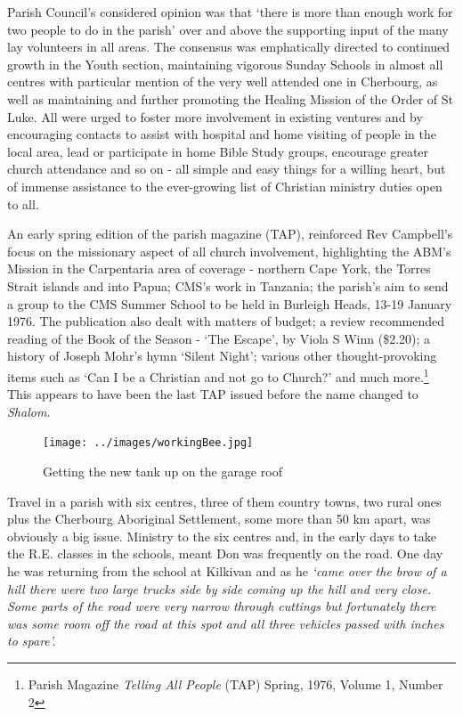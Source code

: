 Parish Council's considered opinion was that `there is more than enough work for two people to do in the parish' over and above the supporting input of the many lay volunteers in all areas. The consensus was emphatically directed to continued growth in the Youth section, maintaining vigorous Sunday Schools in almost all centres with particular mention of the very well attended one in Cherbourg, as well as maintaining and further promoting the Healing Mission of the Order of St Luke. All were urged to foster more involvement in existing ventures and by encouraging contacts to assist with hospital and home visiting of people in the local area, lead or participate in home Bible Study groups, encourage greater church attendance and so on - all simple and easy things for a willing heart, but of immense assistance to the ever-growing list of Christian ministry duties open to all.



An early spring edition of the parish magazine (TAP), reinforced Rev Campbell's focus on the missionary aspect of all church involvement, highlighting the ABM's Mission in the Carpentaria area of coverage - northern Cape York, the Torres Strait islands and into Papua; CMS's work in Tanzania; the parish's aim to send a group to the CMS Summer School to be held in Burleigh Heads, 13-19 January 1976. The publication also dealt with matters of budget; a review recommended reading of the Book of the Season - `The Escape', by Viola S Winn (\$2.20); a history of Joseph Mohr's hymn `Silent Night'; various other thought-provoking items such as `Can I be a Christian and not go to Church?' and much more.\footnote{Parish Magazine \emph{Telling All People} (TAP) Spring, 1976, Volume 1, Number 2} This appears to have been the last TAP issued before the name changed to \emph{Shalom}.








\begin{figure}[!htb]
\begin{center}
\texttt{[image: ../images/workingBee.jpg]}
\caption{Getting the new tank up on the garage roof}
\end{center}
\end{figure}




Travel in a parish with six centres, three of them country towns, two rural ones plus the Cherbourg Aboriginal Settlement, some more than 50 km apart, was obviously a big issue. Ministry to the six centres and, in the early days to take the R.E. classes in the schools, meant Don was frequently on the road. One day he was returning from the school at Kilkivan and as he \emph{`came over the brow of a hill there were two large trucks side by side coming up the hill and very close. Some parts of the road were very narrow through cuttings but fortunately there was some room off the road at this spot and all three vehicles passed with inches to spare'.}



